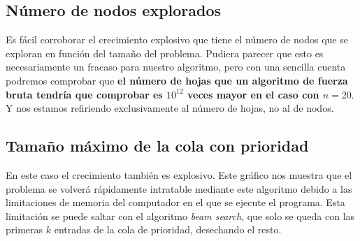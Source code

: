 \documentclass[a4paper, 11pt]{article}
\begin{document}
\subsection{Número de nodos explorados}
Es fácil corroborar el crecimiento explosivo que tiene el número de nodos que se exploran en función del tamaño del problema. Pudiera parecer que esto es necesariamente un fracaso para nuestro algoritmo, pero con una sencilla cuenta podremos comprobar que \textbf{el número de hojas que un algoritmo de fuerza bruta tendría que comprobar es $10^{12}$ veces mayor en el caso con $n = 20$}. Y nos estamos refiriendo exclusivamente al número de hojas, no al de nodos.

\subsection{Tamaño máximo de la cola con prioridad}
En este caso el crecimiento también es explosivo. Este gráfico nos muestra que el problema se volverá rápidamente intratable mediante este algoritmo debido a las limitaciones de memoria del computador en el que se ejecute el programa. Esta limitación se puede saltar con el algoritmo \textit{beam search}, que solo se queda con las primeras $k$ entradas de la cola de prioridad, desechando el resto.
\end{document}
